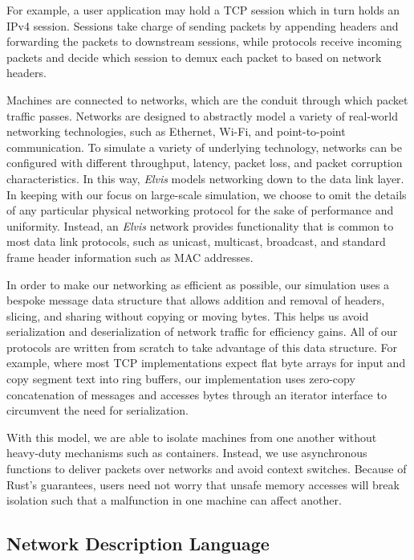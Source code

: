 \documentclass[journal]{IEEEtran} %
\newcommand{\elvis}{\textit{Elvis}}
\begin{document}
For example, a user application may hold a TCP session which in turn holds an IPv4 session. Sessions take charge of sending packets by appending headers and forwarding the packets to downstream sessions, while protocols receive incoming packets and decide which session to demux each packet to based on network headers.

Machines are connected to networks, which are the conduit through which packet traffic passes. Networks are designed to abstractly model a variety of real-world networking technologies, such as Ethernet, Wi-Fi, and point-to-point communication. To simulate a variety of underlying technology, networks can be configured with different throughput, latency, packet loss, and packet corruption characteristics. In this way, \elvis{} models networking down to the data link layer. In keeping with our focus on large-scale simulation, we choose to omit the details of any particular physical networking protocol for the sake of performance and uniformity. Instead, an \elvis{} network provides functionality that is common to most data link protocols, such as unicast, multicast, broadcast, and standard frame header information such as MAC addresses.

In order to make our networking as efficient as possible, our simulation uses a bespoke message data structure that allows addition and removal of headers, slicing, and sharing without copying or moving bytes. This helps us avoid serialization and deserialization of network traffic for efficiency gains. All of our protocols are written from scratch to take advantage of this data structure. For example, where most TCP implementations expect flat byte arrays for input and copy segment text into ring buffers, our implementation uses zero-copy concatenation of messages and accesses bytes through an iterator interface to circumvent the need for serialization.

With this model, we are able to isolate machines from one another without heavy-duty mechanisms such as containers. Instead, we use asynchronous functions to deliver packets over networks and avoid context switches. Because of Rust’s guarantees, users need not worry that unsafe memory accesses will break isolation such that a malfunction in one machine can affect another.


\subsection{Network Description Language}
\end{document}
